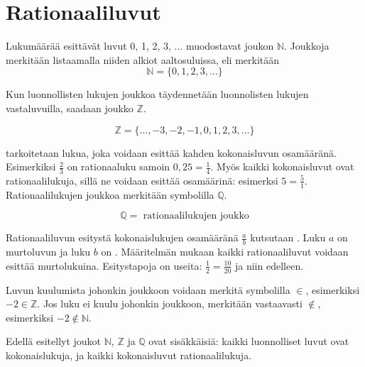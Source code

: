 \section{Rationaaliluvut}
    \label{rationaaliluvut}
    
Lukumäärää esittävät luvut 0, 1, 2, 3, ... muodostavat  joukon $\mathbb{N}$.
Joukkoja merkitään listaamalla niiden alkiot aaltosuluissa, eli merkitään
\[\mathbb{N}=\{0, 1, 2, 3, \ldots \} \]

Kun luonnollisten lukujen joukkoa täydennetään luonnolisten lukujen vastaluvuilla, saadaan  joukko $\mathbb{Z}$.

\[\mathbb{Z}=\{\ldots, -3, -2, -1, 0, 1, 2, 3, \ldots \} \]

 tarkoitetaan lukua, joka voidaan esittää kahden kokonaisluvun osamääränä. Esimerkiksi $\frac{2}{3}$ on rationaaluku samoin $0,25=\frac{1}{4}$. Myös kaikki kokonaisluvut ovat rationaalilukuja, sillä ne voidaan esittää osamäärinä: esimerksi $5=\frac{5}{1}$. Rationaalilukujen joukkoa
    merkitään symbolilla $\mathbb{Q}$.

\[\mathbb{Q}= \text{ rationaalilukujen joukko} \]    
    
     Rationaaliluvun esitystä kokonaislukujen osamääränä
    $\frac{a}{b}$ kutsutaan . Luku $a$ on murtoluvun
     ja luku $b$ on
    . Määritelmän mukaan kaikki rationaaliluvut
    voidaan esittää murtolukuina. Esitystapoja on useita: $\frac{1}{2}=\frac{10}{20}$ ja niin edelleen.

Luvun kuulumista johonkin joukkoon voidaan merkitä symbolilla $\in$,
esimerkiksi $-2 \in \mathbb{Z}$. Jos luku ei kuulu johonkin joukkoon, merkitään vastaavasti $\notin$, esimerkiksi $-2 \notin \mathbb{N}$.

Edellä esitellyt joukot $\mathbb{N}$, $\mathbb{Z}$ ja 
$\mathbb{Q}$ ovat sisäkkäisiä: kaikki luonnolliset luvut ovat kokonaislukuja, ja kaikki kokonaisluvut rationaalilukuja.

    
    

